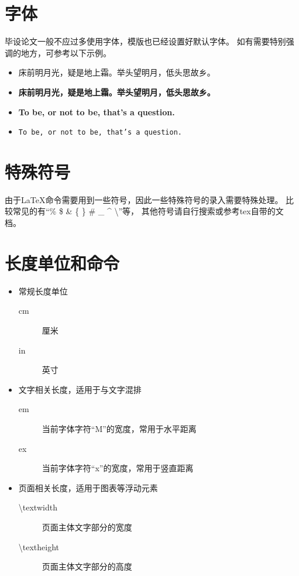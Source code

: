 \section{字体}
\label{sec-font}

毕设论文一般不应过多使用字体，模版也已经设置好默认字体。
如有需要特别强调的地方，可参考以下示例。
\begin{itemize}
    \item {\heiti 床前明月光，疑是地上霜。举头望明月，低头思故乡。}
    \item {\bf 床前明月光，疑是地上霜。举头望明月，低头思故乡。}
    \item \textbf{To be, or not to be, that's a question.}
    \item \texttt{To be, or not to be, that's a question.}
\end{itemize}

\section{特殊符号}
\label{sec-symbol}

由于\LaTeX{}命令需要用到一些符号，因此一些特殊符号的录入需要特殊处理。
比较常见的有“\% \$ \& \{ \} \# \_ \^{} \textbackslash”等，
其他符号请自行搜索或参考tex自带的文档。

\section{长度单位和命令}
\label{sec-length}

\begin{itemize}
    \item 常规长度单位
    \begin{description}
        \item[cm] 厘米
        \item[in] 英寸
    \end{description}
    \item 文字相关长度，适用于与文字混排
    \begin{description}
        \item[em] 当前字体字符“M”的宽度，常用于水平距离
        \item[ex] 当前字体字符“x”的宽度，常用于竖直距离
    \end{description}
    \item 页面相关长度，适用于图表等浮动元素
    \begin{description}
        \item[\textbackslash textwidth]  页面主体文字部分的宽度
        \item[\textbackslash textheight] 页面主体文字部分的高度
    \end{description}
\end{itemize}

